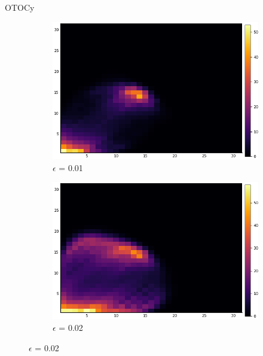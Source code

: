 \documentclass{article}
\begin{document}
\begin{section}{OTOCy}
\begin{figure}[H]
\begin{subfigure}{.33\textwidth}
                            \end{subfigure}%
                            \begin{subfigure}{.33\textwidth}
                              \centering
                              \includegraphics[width=1.0\linewidth]{2.png}
                              \caption{$\epsilon$ = 0.01}


                            \end{subfigure}%
                            \begin{subfigure}{.33\textwidth}
                              \centering
                              \includegraphics[width=1.0\linewidth]{3.png}
                              \caption{$\epsilon$ = 0.02}

                            \end{subfigure}%


\end{figure}
\end{section}
\end{document}
